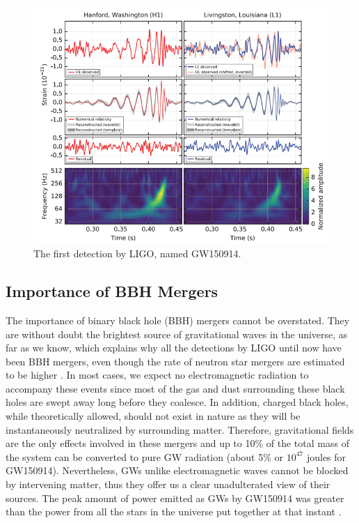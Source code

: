 \documentclass[aps,twocolumn,secnumarabic,nobalancelastpage,amsmath,amssymb,
nofootinbib]{revtex4}
\begin{document}
	\begin{figure}[]
		\includegraphics[width=\linewidth]{ligo.png}
		\caption{The first detection by LIGO, named GW150914. \cite{gw1}}
		\label{ligo}
	\end{figure}

	\subsection{Importance of BBH Mergers}
	The importance of binary black hole (BBH) mergers cannot be overstated. They are without doubt the brightest source of gravitational waves in the universe, as far as we know, which explains why all the detections by LIGO until now have been BBH mergers, even though the rate of neutron star mergers are estimated to be higher \cite{LP}. In most cases, we expect no electromagnetic radiation to accompany these events since most of the gas and dust surrounding these black holes are swept away long before they coalesce. In addition, charged black holes, while theoretically allowed, should not exist in nature as they will be instantaneously neutralized by surrounding matter. Therefore, gravitational fields are the only effects involved in these mergers and up to 10\% of the total mass of the system can be converted to pure GW radiation \cite{living} (about 5\% or $10^{47}$ joules for GW150914). Nevertheless, GWs unlike electromagnetic waves cannot be blocked by intervening matter, thus they offer us a clear unadulterated view of their sources. The peak amount of power emitted as GWs by GW150914 was greater than the power from all the stars in the universe put together at that instant \cite{gw1}.
	\newline
	
\end{document}
